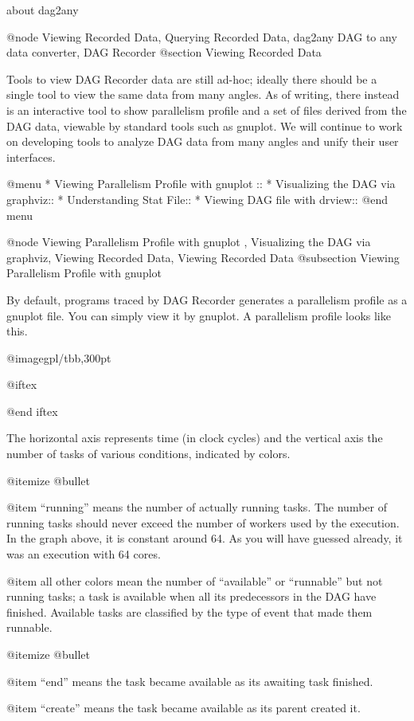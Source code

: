 about dag2any

@node Viewing Recorded Data, Querying Recorded Data, dag2any DAG to any data converter, DAG Recorder
@section Viewing Recorded Data

Tools to view DAG Recorder data are still ad-hoc; ideally there should
be a single tool to view the same data from many angles.  As of writing,
there instead is an interactive tool to show parallelism profile and a
set of files derived from the DAG data, viewable by standard tools such as
gnuplot.  We will continue to work on developing tools to analyze DAG
data from many angles and unify their user interfaces.

@menu
* Viewing Parallelism Profile with gnuplot ::
* Visualizing the DAG via graphviz::
* Understanding Stat File::
* Viewing DAG file with drview::
@end menu

@node Viewing Parallelism Profile with gnuplot , Visualizing the DAG via graphviz, Viewing Recorded Data, Viewing Recorded Data
@subsection Viewing Parallelism Profile with gnuplot 

By default, programs traced by DAG Recorder generates a parallelism profile as a gnuplot file.  You can simply view it by gnuplot.  A parallelism profile looks like this.

@image{gpl/tbb,300pt}

@iftex


@end iftex

The horizontal axis represents time (in clock cycles) and the vertical
axis the number of tasks of various conditions, indicated by colors.

@itemize @bullet

@item ``running'' means the number of actually running tasks.
The number of running tasks should never exceed the number of workers used
by the execution.  In the graph above, it is constant around 64.  As you
will have guessed already, it was an execution with 64 cores.

@item all other colors mean the number of ``available'' or 
``runnable'' but not running tasks; a task is available when all its
predecessors in the DAG have finished.  Available tasks are classified
by the type of event that made them runnable.  

@itemize @bullet

@item ``end'' means the task became available as its awaiting task finished.

@item ``create'' means the task became available as its parent created it.

